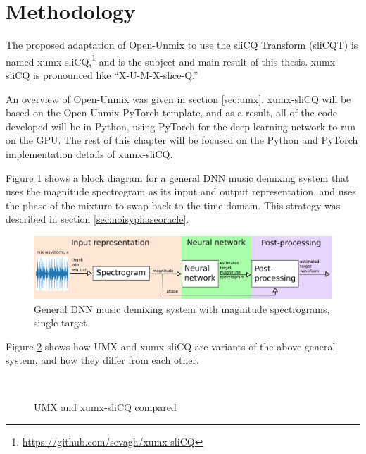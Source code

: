 \documentclass[report.tex]{subfiles}
\begin{document}
\section{Methodology}
\label{sec:methodology}

The proposed adaptation of Open-Unmix to use the sliCQ Transform (sliCQT) is named xumx-sliCQ,\footnote{\url{https://github.com/sevagh/xumx-sliCQ}} and is the subject and main result of this thesis. xumx-sliCQ is pronounced like ``X-U-M-X-slice-Q.''

An overview of Open-Unmix was given in section \ref{sec:umx}. xumx-sliCQ will be based on the Open-Unmix PyTorch template, and as a result, all of the code developed will be in Python, using PyTorch for the deep learning network to run on the GPU. The rest of this chapter will be focused on the Python and PyTorch implementation details of xumx-sliCQ.

Figure \ref{fig:generalmdx} shows a block diagram for a general DNN music demixing system that uses the magnitude spectrogram as  its input and output representation, and uses the phase of the mixture to swap back to the time domain. This strategy was described in section \ref{sec:noisyphaseoracle}.

\begin{figure}[ht]
	\centering
	\includegraphics[width=\textwidth]{./images-blockdiagrams/generic_mdx.png}
	\caption{General DNN music demixing system with magnitude spectrograms, single target}
	\label{fig:generalmdx}
\end{figure}

Figure \ref{fig:umxandxumxslicq} shows how UMX and xumx-sliCQ are variants of the above general system, and how they differ from each other.

\begin{figure}[ht]
	\centering
	\\
	\caption{UMX and xumx-sliCQ compared}
	\label{fig:umxandxumxslicq}
\end{figure}
\end{document}
